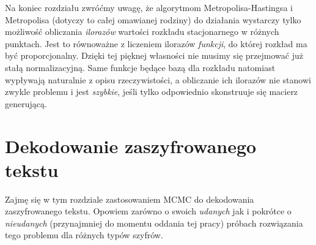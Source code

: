 \documentclass[a4paper]{article}
\theoremstyle{defn}
\theoremstyle{theorem}
\theoremstyle{lemma}
\theoremstyle{cor}
\theoremstyle{fact}
\begin{document}
Na koniec rozdziału zwróćmy uwagę, że algorytmom Metropolisa-Hastingsa i Metropolisa (dotyczy to całej omawianej rodziny) do działania wystarczy tylko możliwość obliczania \textit{ilorazów} wartości rozkładu stacjonarnego w różnych punktach. Jest to równoważne z liczeniem ilorazów \textit{funkcji}, do której rozkład ma być proporcjonalny. Dzięki tej pięknej własności nie musimy się przejmować już stałą normalizacyjną. Same funkcje będące bazą dla rozkładu natomiast wypływają naturalnie z opisu rzeczywistości, a obliczanie ich ilorazów nie stanowi zwykle problemu i jest \textit{szybkie}, jeśli tylko odpowiednio skonstruuje się macierz generującą.
\newpage

\section{Dekodowanie zaszyfrowanego tekstu}
Zajmę się w tym rozdziale zastosowaniem MCMC do dekodowania zaszyfrowanego tekstu. Opowiem zarówno o swoich \textit{udanych} jak i pokrótce o \textit{nieudanych} (przynajmniej do momentu oddania tej pracy) próbach rozwiązania tego problemu dla różnych typów szyfrów.
\end{document}
